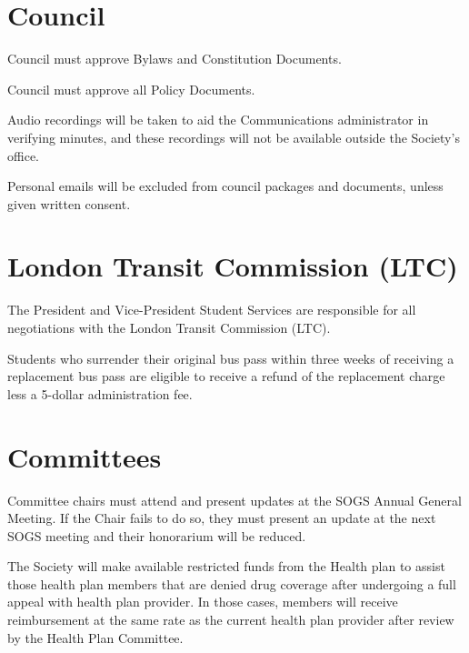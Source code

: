 \section{Council}
\begin{longenum}[ label*=\thesection.\arabic*., align=left]
\item Council must approve Bylaws and Constitution Documents.
\item Council must approve all Policy Documents.
\item Audio recordings will be taken to aid the Communications administrator in verifying minutes, and these recordings will not be available outside the Society’s office.
\item Personal emails will be excluded from council packages and documents, unless given written consent.
\end{longenum}

\section{London Transit Commission (LTC)}
\begin{longenum}[ label*=\thesection.\arabic*., align=left]
\item The President and Vice-President Student Services are responsible for all negotiations with the London Transit Commission (LTC).
\item Students who surrender their original bus pass within three weeks of receiving a replacement bus pass are eligible to receive a refund of the replacement charge less a 5-dollar administration fee.
\end{longenum}

\section{Committees}
\begin{longenum}[ label*=\thesection.\arabic*., align=left]
\item Committee chairs must attend and present updates at the SOGS Annual General Meeting. If the Chair fails to do so, they must present an update at the next SOGS meeting and their honorarium will be reduced.
\item The Society will make available restricted funds from the Health plan to assist those health plan members that are denied drug coverage after undergoing a full appeal with health plan provider. In those cases, members will receive reimbursement at the same rate as the current health plan provider after review by the Health Plan Committee.
\astfootnote
\end{longenum}

